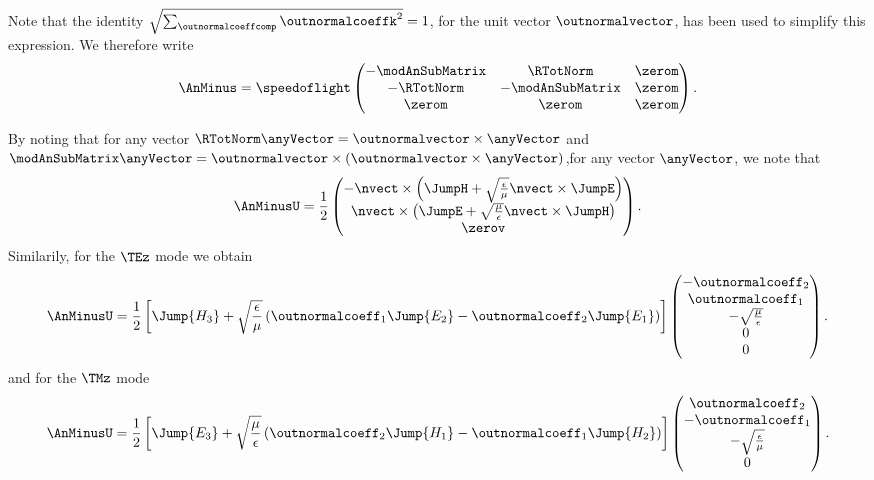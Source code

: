Note that the identity $\sqrt{\sum_{\outnormalcoeffcomp} \outnormalcoeffk^2} = 1$, for the unit vector $\outnormalvector$, has been used to simplify this expression. We therefore write
\begin{align*}
\AnMinus = \speedoflight
\begin{pmatrix}
  -\modAnSubMatrix & \RTotNorm & \zerom \\
  -\RTotNorm  & -\modAnSubMatrix & \zerom \\
   \zerom & \zerom & \zerom 
\end{pmatrix} .
\end{align*}

By noting that for any vector $\RTotNorm \anyVector = \outnormalvector \times \anyVector$ and $\modAnSubMatrix \anyVector = \outnormalvector \times \left(  \outnormalvector
  \times \anyVector \right)$,for any vector $\anyVector$, we note that
\begin{align*}
\AnMinusU = \frac{1}{2}
\begin{pmatrix}
  -\nvect \times \left( \JumpH + \sqrt{\frac{\epsilon}{\mu}} \nvect \times \JumpE \right) \\
   \nvect \times \left( \JumpE + \sqrt{\frac{\mu}{\epsilon}} \nvect \times \JumpH \right) \\
  \zerov
\end{pmatrix} .
\end{align*}
Similarily, for the $\TEz$ mode we obtain
\begin{align*}
\AnMinusU =
  \frac{1}{2}
  \left[
    \Jump{H_3} + \sqrt{\frac{\epsilon}{\mu}}
    \left(
      \outnormalcoeff_1 \Jump{E_2} - 
      \outnormalcoeff_2 \Jump{E_1}
    \right)
  \right]
\begin{pmatrix}
   -\outnormalcoeff_2 \\
   \outnormalcoeff_1 \\
   - \sqrt{ \frac{\mu}{\epsilon} } \\
   0  \\
   0 
\end{pmatrix} .
\end{align*}
and for the $\TMz$ mode
\begin{align*}
\AnMinusU =
  \frac{1}{2}
  \left[
    \Jump{E_3} + \sqrt{\frac{\mu}{\epsilon}}
    \left(
      \outnormalcoeff_2 \Jump{H_1} - 
      \outnormalcoeff_1 \Jump{H_2}
    \right)
  \right]
\begin{pmatrix}
   \outnormalcoeff_2 \\
   -\outnormalcoeff_1 \\
   -\sqrt{ \frac{\epsilon}{\mu} } \\
   0 
\end{pmatrix} .
\end{align*}

